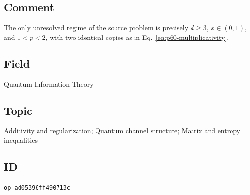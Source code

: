 \subsection*{Comment}

The only unresolved regime of the source problem is precisely
$d\geq3$, $x\in(0,1)$, and $1<p<2$, with two identical copies as in
Eq.~\eqref{eq:p60-multiplicativity}.

\subsection*{Field}

Quantum Information Theory

\subsection*{Topic}

Additivity and regularization; Quantum channel structure; Matrix and entropy inequalities

\subsection*{ID}

\texttt{op\_ad05396ff490713c}
